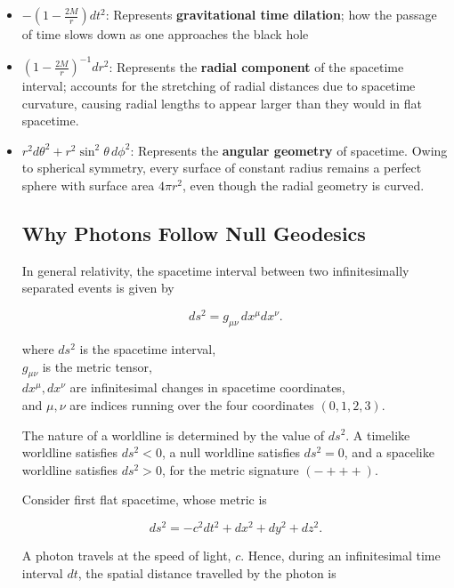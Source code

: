 \documentclass[12pt]{article}
\begin{document}
\begin{itemize}
    \item $\displaystyle -\left(1-\frac{2M}{r}\right)dt^2$: Represents \textbf{gravitational time dilation}; how the passage of time slows down as one approaches the black hole

    \item $\displaystyle \left(1-\frac{2M}{r}\right)^{-1}dr^2$: Represents the \textbf{radial component} of the spacetime interval; accounts for the stretching of radial distances due to spacetime curvature, causing radial lengths to appear larger than they would in flat spacetime.

    \item $\displaystyle r^2d\theta^2 + r^2\sin^2\theta\,d\phi^2$: Represents the \textbf{angular geometry} of spacetime. Owing to spherical symmetry, every surface of constant radius remains a perfect sphere with surface area $4\pi r^2$, even though the radial geometry is curved.

\subsection{Why Photons Follow Null Geodesics}

In general relativity, the spacetime interval between two infinitesimally separated events is given by

\[
ds^2 = g_{\mu\nu}\,dx^\mu dx^\nu.
\]
\begin{center}
where $ds^2$ is the spacetime interval,\\
$g_{\mu\nu}$ is the metric tensor,\\
$dx^\mu, dx^\nu$ are infinitesimal changes in spacetime coordinates,\\
and $\mu,\nu$ are indices running over the four coordinates $(0,1,2,3)$.
\end{center}

The nature of a worldline is determined by the value of \(ds^2\). A timelike worldline satisfies \(ds^2 < 0\), a null worldline satisfies \(ds^2 = 0\), and a spacelike worldline satisfies \(ds^2 > 0\), for the metric signature \((-+++)\).

Consider first flat spacetime, whose metric is

\[
ds^2 = -c^2dt^2 + dx^2 + dy^2 + dz^2.
\]

A photon travels at the speed of light, \(c\). Hence, during an infinitesimal time interval \(dt\), the spatial distance travelled by the photon is


\end{itemize}
\end{document}
